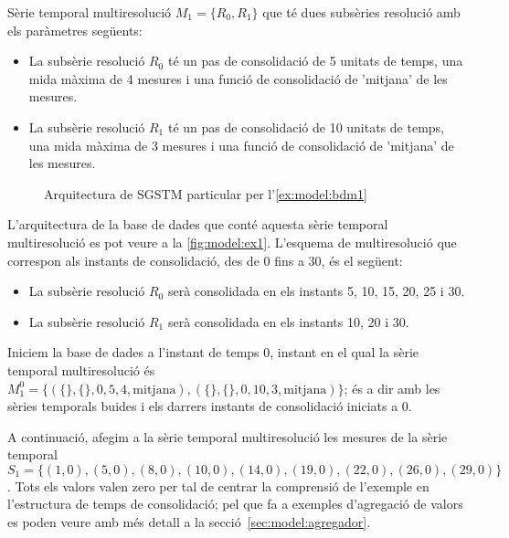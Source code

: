 \begin{example} 
\label{ex:model:bdm1}%


Sèrie temporal multiresolució $M_1=\{R_0,R_1\}$ que té dues subsèries
resolució amb els paràmetres següents:
\begin{itemize}
\item La subsèrie resolució $R_0$ té un pas de consolidació de 5
  unitats de temps, una mida màxima de 4 mesures i una funció de
  consolidació de 'mitjana' de les mesures.
\item La subsèrie resolució $R_1$ té un pas de consolidació de 10
  unitats de temps, una mida màxima de 3 mesures i una funció de
  consolidació de 'mitjana' de les mesures.
\end{itemize}

\begin{figure}[tp]
\centering

\caption{Arquitectura de SGSTM particular per l'\autoref{ex:model:bdm1}}
\label{fig:model:ex1}
\end{figure}

L'arquitectura de la base de dades que conté aquesta sèrie temporal
multiresolució es pot veure a la \autoref{fig:model:ex1}. 
 L'esquema
de multiresolució que correspon als instants de consolidació, des de 0
fins a 30, és el següent:
\begin{itemize}
\item La subsèrie resolució $R_0$ serà consolidada en els instants 5,
  10, 15, 20, 25 i 30.
\item La subsèrie resolució $R_1$ serà consolidada en els instants 10,
  20 i 30.
\end{itemize}


Iniciem la base de dades a l'instant de temps 0, instant en el qual la
sèrie temporal multiresolució és $M_1^0 = \{ ( \{\} , \{\} , 0 , 5 ,4
, \text{mitjana} ) , ( \{\} , \{\} , 0 , 10 ,3 , \text{mitjana} ) \}$;
és a dir amb les sèries temporals buides i els darrers instants de
consolidació iniciats a 0.




A continuació, afegim a la sèrie temporal multiresolució les mesures
de la sèrie temporal $S_1=\{
(1,0),(5,0),(8,0),(10,0),(14,0),(19,0),(22,0),(26,0),(29,0) \}$. Tots
els valors valen zero per tal de centrar la comprensió de l'exemple en
l'estructura de temps de consolidació; pel que fa a exemples
d'agregació de valors es poden veure amb més detall a la
secció~\ref{sec:model:agregador}.



\end{example}
